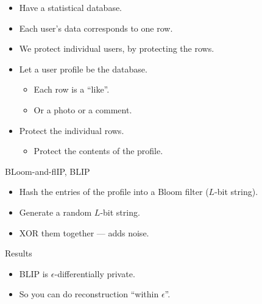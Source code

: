 \begin{frame}
  \begin{example}
    \begin{itemize}
      \item Have a statistical database.
      \item Each user's data corresponds to one row.

        \pause{}

      \item We protect individual users, by protecting the rows.
    \end{itemize}
  \end{example}

  \pause{}

  \begin{example}
    \begin{itemize}
      \item Let a user profile be the database.
        \begin{itemize}
          \item Each row is a \enquote{like}.
          \item Or a photo or a comment.
        \end{itemize}

        \pause{}

      \item Protect the individual rows.
        \begin{itemize}
          \item Protect the contents of the profile.
        \end{itemize}
    \end{itemize}
  \end{example}
\end{frame}

\begin{frame}
  \begin{block}{BLoom-and-flIP, BLIP}
    \begin{itemize}
      \item Hash the entries of the profile into a Bloom filter (\(L\)-bit 
        string).

        \pause{}

      \item Generate a random \(L\)-bit string.
      \item XOR them together --- adds noise.
    \end{itemize}
  \end{block}

  \pause{}

  \begin{block}{Results}
    \begin{itemize}
      \item BLIP is \(\epsilon\)-differentially private.
      \item So you can do reconstruction \enquote{within \(\epsilon\)}.
    \end{itemize}
  \end{block}
\end{frame}


